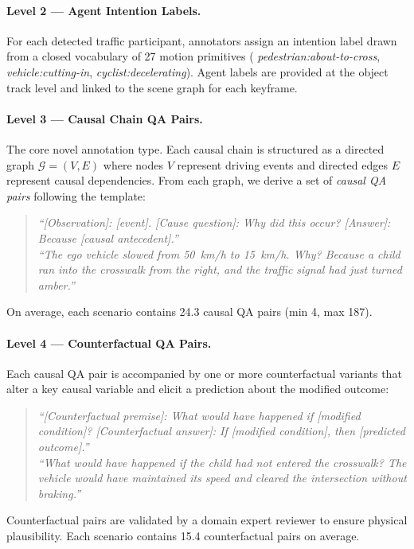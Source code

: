 \paragraph{Level 2 --- Agent Intention Labels.}
For each detected traffic participant, annotators assign an intention label drawn
from a closed vocabulary of 27 motion primitives (\eg{} \emph{pedestrian:about-to-cross},
\emph{vehicle:cutting-in}, \emph{cyclist:decelerating}). Agent labels are provided at
the object track level and linked to the scene graph for each keyframe.

\paragraph{Level 3 --- Causal Chain QA Pairs.}
The core novel annotation type. Each causal chain is structured as a directed
graph $\mathcal{G} = (V, E)$ where nodes $V$ represent driving events and directed
edges $E$ represent causal dependencies. From each graph, we derive a set of
\emph{causal QA pairs} following the template:
\begin{quote}
  \textit{``[Observation]: [event]. [Cause question]: Why did this occur?
  [Answer]: Because [causal antecedent].''} \\[4pt]
  \eg{} \textit{``The ego vehicle slowed from 50~km/h to 15~km/h.
  Why? Because a child ran into the crosswalk from the right, and the traffic
  signal had just turned amber.''} 
\end{quote}
On average, each scenario contains 24.3 causal QA pairs (min 4, max 187).

\paragraph{Level 4 --- Counterfactual QA Pairs.}
Each causal QA pair is accompanied by one or more counterfactual variants that
alter a key causal variable and elicit a prediction about the modified outcome:
\begin{quote}
  \textit{``[Counterfactual premise]: What would have happened if [modified condition]?
  [Counterfactual answer]: If [modified condition], then [predicted outcome].''} \\[4pt]
  \eg{} \textit{``What would have happened if the child had not entered the crosswalk?
  The vehicle would have maintained its speed and cleared the intersection without braking.''} 
\end{quote}
Counterfactual pairs are validated by a domain expert reviewer to ensure physical
plausibility. Each scenario contains 15.4 counterfactual pairs on average.

